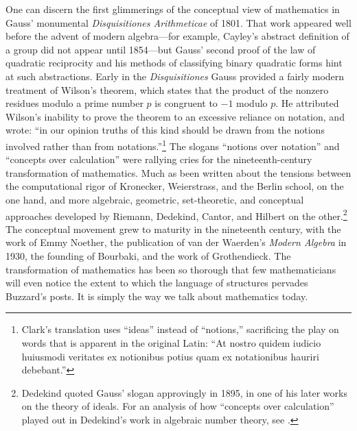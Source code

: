 \documentclass{amsart}
\theoremstyle{definition}
\theoremstyle{remark}
\numberwithin{equation}{section}
\begin{document}
One can discern the first glimmerings of the conceptual view of mathematics in Gauss' monumental \emph{Disquisitiones Arithmeticae} of 1801. That work appeared well before the advent of modern algebra---for example, Cayley's abstract definition of a group did not appear until 1854---but Gauss' second proof of the law of quadratic reciprocity and his methods of classifying binary quadratic forms hint at such abstractions. Early in the \emph{Disquisitiones} Gauss provided a fairly modern treatment of Wilson's theorem, which states that the product of the nonzero residues modulo a prime number $p$ is congruent to $-1$ modulo $p$. He attributed Wilson's inability to prove the theorem to an excessive reliance on notation, and wrote: ``in our opinion truths of this kind should be drawn from the notions involved rather than from notations.''\footnote{Clark's translation \cite[Section 76]{gauss:disquisitiones:arithmeticae} uses ``ideas'' instead of ``notions,'' sacrificing the play on words that is apparent in the original Latin: ``At nostro quidem iudicio huiusmodi veritates ex notionibus potius quam ex notationibus hauriri debebant.''} The slogans ``notions over notation'' and ``concepts over calculation'' were rallying cries for the nineteenth-century transformation of mathematics. Much as been written about the tensions between the computational rigor of Kronecker, Weierstrass, and the Berlin school, on the one hand, and more algebraic, geometric, set-theoretic, and conceptual approaches developed by Riemann, Dedekind, Cantor, and Hilbert on the other.\footnote{Dedekind quoted Gauss' slogan approvingly in 1895, in one of his later works on the theory of ideals. For an analysis of how ``concepts over calculation'' played out in Dedekind's work in algebraic number theory, see \cite{avigad:06}.} The conceptual movement grew to maturity in the nineteenth century, with the work of Emmy Noether, the publication of van der Waerden's \emph{Modern Algebra} in 1930, the founding of Bourbaki, and the work of Grothendieck. The transformation of mathematics has been so thorough that few mathematicians will even notice the extent to which the language of structures pervades Buzzard's posts. It is simply the way we talk about mathematics today.
\end{document}
